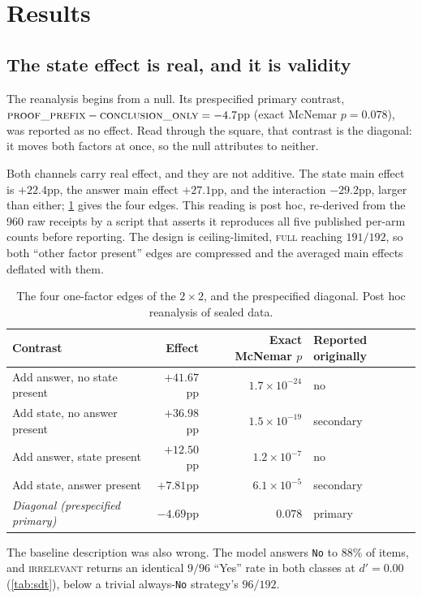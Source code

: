 \documentclass[10pt,twocolumn]{article}
\begin{document}
\section{Results}

\subsection{The state effect is real, and it is validity}

The reanalysis begins from a null. Its prespecified primary contrast,
$\textsc{proof\_prefix} - \textsc{conclusion\_only} = -4.7$pp (exact McNemar
$p = 0.078$), was reported as no effect. Read through the square, that contrast
is the diagonal: it moves both factors at once, so the null attributes to
neither.

Both channels carry real effect, and they are not
additive. The state
main effect is $+22.4$pp, the answer main effect $+27.1$pp, and the interaction
$-29.2$pp, larger than either; \cref{tab:edges} gives the four edges. This
reading is post hoc, re-derived from the 960 raw receipts by a script that
asserts it reproduces all five published per-arm counts before reporting. The
design is ceiling-limited, \textsc{full} reaching $191/192$, so both
``other factor present'' edges are compressed and the averaged main effects
deflated with them.

\begin{table}[tb]
\centering\small
\caption{The four one-factor edges of the $2\times2$, and the prespecified
diagonal. Post hoc reanalysis of sealed data.}
\label{tab:edges}
\begin{tabular}{lrrl}
\toprule
Contrast & Effect & Exact McNemar $p$ & Reported originally \\
\midrule
Add answer, no state present   & $+41.67$pp & $1.7\times10^{-24}$ & no \\
Add state, no answer present   & $+36.98$pp & $1.5\times10^{-19}$ & secondary \\
Add answer, state present      & $+12.50$pp & $1.2\times10^{-7}$  & no \\
Add state, answer present      & $+7.81$pp  & $6.1\times10^{-5}$  & secondary \\
\midrule
\emph{Diagonal (prespecified primary)} & $-4.69$pp & $0.078$ & primary \\
\bottomrule
\end{tabular}
\end{table}

The baseline description was also wrong. The model answers \texttt{No}
to $88\%$ of items, and \textsc{irrelevant} returns an identical $9/96$ ``Yes''
rate in both classes at $d' = 0.00$ (\cref{tab:sdt}), below a trivial
always-\texttt{No} strategy's $96/192$.
\end{document}
